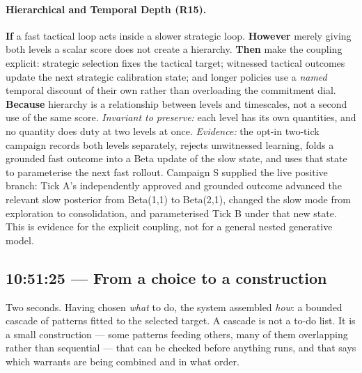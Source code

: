 \paragraph{Hierarchical and Temporal Depth (R15).} \textbf{If} a fast tactical loop acts inside a slower strategic loop. \textbf{However} merely giving both levels a scalar score does not create a hierarchy. \textbf{Then} make the coupling explicit: strategic selection fixes the tactical target; witnessed tactical outcomes update the next strategic calibration state; and longer policies use a \emph{named} temporal discount of their own rather than overloading the commitment dial. \textbf{Because} hierarchy is a relationship between levels and timescales, not a second use of the same score.  \emph{Invariant to preserve:} each level has its own quantities, and no quantity does duty at two levels at once.  \emph{Evidence:} the opt-in two-tick campaign records both levels separately, rejects unwitnessed learning, folds a grounded fast outcome into a Beta update of the slow state, and uses that state to parameterise the next fast rollout.  Campaign S supplied the live positive branch: Tick A's independently approved and grounded outcome advanced the relevant slow posterior from Beta(1,1) to Beta(2,1), changed the slow mode from exploration to consolidation, and parameterised Tick B under that new state.  This is evidence for the explicit coupling, not for a general nested generative model.

\subsection*{10:51:25 --- From a choice to a construction}

Two seconds.  Having chosen \emph{what} to do, the system assembled \emph{how}:
a bounded cascade of patterns fitted to the selected target.  A cascade is not a
to-do list.  It is a small construction --- some patterns feeding others, many
of them overlapping rather than sequential --- that can be checked before
anything runs, and that says which warrants are being combined and in what
order.

